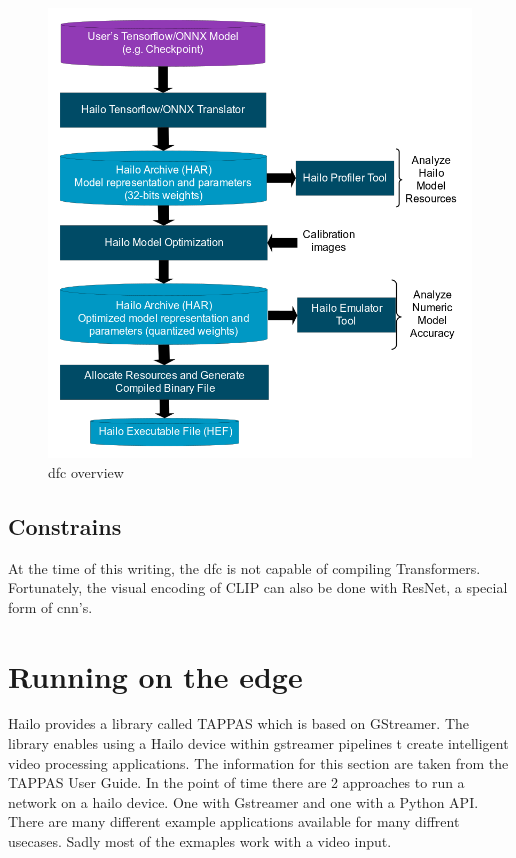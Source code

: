 \begin{figure}
    \centering
    \includegraphics[width=\textwidth]{Images/Hardware/model_build_overview_with_onnx_and_hef_w_har.png}
    \caption{\Acrlong{dfc} overview \cite{hailo_dataflow_compiler}}
    \label{fig:hardware:dfcoverview}
\end{figure}

\subsection{Constrains}
At the time of this writing, the \acrshort{dfc} is not capable of compiling Transformers.
Fortunately, the visual encoding of CLIP can also be done with ResNet, a special form of \Acrshort{cnn}'s.

\section{Running on the edge}

Hailo provides a library called TAPPAS which is based on GStreamer.
The library enables using a Hailo device within gstreamer pipelines t create intelligent video processing applications.
The information for this section are taken from the TAPPAS User Guide.
In the point of time there are 2 approaches to run a network on a hailo device.
One with Gstreamer and one with a Python API.
There are many different example applications available for many diffrent usecases.
Sadly most of the exmaples work with a video input.


